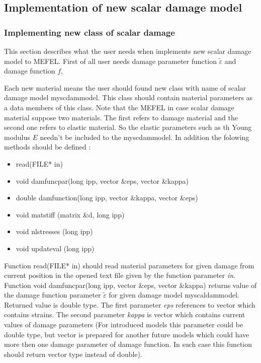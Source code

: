 \subsection{Implementation of new scalar damage  model}
\subsubsection {Implementing new class of scalar damage}
This section describes what the user needs when implements new scalar damage model
to MEFEL. First of all user needs damage parameter function $\tilde {\varepsilon}$ and damage function $f$,

Each new material means the user should found new class with name of scalar damage model {\sf myscdammodel}.
This class should contain material parameters as a data members of this class. Note that the MEFEL
in case scalar damage material suppose two materials. The first refers to damage material and the second
one refers to elastic material. So the elastic parameters such as th Young modulus $E$ needn't be
included to the {\sf myscdammodel}. In addition the folowing methods should be defined :
\begin{itemize}
\item
{\sf read(FILE* in)}
\item
{\sf void damfuncpar(long ipp, vector \&eps, vector \&kappa)}
\item
{\sf double damfunction(long ipp, vector \&kappa, vector \&eps)}
\item
{\sf void matstiff (matrix \&d, long ipp)}
\item
{\sf void nlstresses (long ipp)}
\item
{\sf void updateval (long ipp)}

\end{itemize}

Function {\sf read(FILE* in)} should read material parameters for given damage from current
position in the opened text file given by the function parameter {\it in}.\\

Function {\sf void damfuncpar(long ipp, vector \&eps, vector \&kappa)} returns value of the damage
function parameter $\tilde {\varepsilon}$ for given damage model {\sf myscaldammodel}.
Returned value is double type. The first parameter {\it eps} references to vector which contains strains.
The second parameter {\it kappa} is vector which contains current values of damage parameters (For
introduced models this parameter could be {\sf double} type, but {\sf vector} is prepared for another
future models which could have more then one damage parameter of damage function. In such case this
function should return {\sf vector} type instead of {\sf double}).\\

